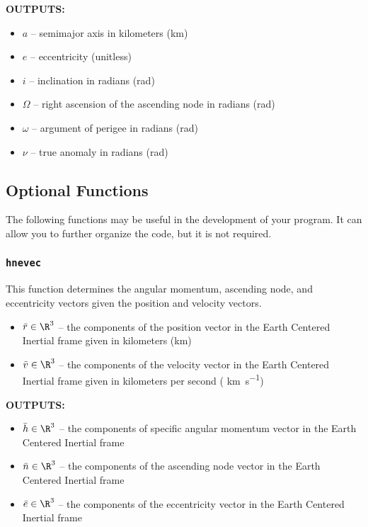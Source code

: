 \documentclass[11pt, reqno]{article}    %
\begin{document}
\noindent \textbf{OUTPUTS:}
\begin{itemize}
    \item \( a \)  -- semimajor axis in kilometers (\si{\kilo\meter})
    \item \( e \) -- eccentricity (unitless)
    \item \( i \) -- inclination in radians (\si{\radian})
    \item \( \Omega \) -- right ascension of the ascending node in radians (\si{\radian})
    \item \( \omega \) -- argument of perigee in radians (\si{\radian})
    \item \( \nu \) -- true anomaly in radians (\si{\radian})
\end{itemize}

\subsection*{Optional Functions}
The following functions may be useful in the development of your program. 
It can allow you to further organize the code, but it is not required.

\subsubsection*{\texttt{hnevec}}
This function determines the angular momentum, ascending node, and eccentricity vectors given the position and velocity vectors.

\begin{itemize}
    \item \( \bar r \in \R^{3} \) -- the components of the position vector in the Earth Centered Inertial frame given in kilometers (\si{\kilo\meter})
    \item \( \bar v \in \R^{3} \) -- the components of the velocity vector in the Earth Centered Inertial frame given in kilometers per second ( \si{\kilo\meter\per\second})
\end{itemize}

\noindent \textbf{OUTPUTS:}
\begin{itemize}
    \item \( \bar h \in \R^{3} \) -- the components of specific angular momentum vector in the Earth Centered Inertial frame 
    \item \( \bar n \in \R^{3} \) -- the components of the ascending node vector in the Earth Centered Inertial frame 
    \item \( \bar e \in \R^{3} \) -- the components of the eccentricity vector in the Earth Centered Inertial frame 
\end{itemize}
\end{document}
